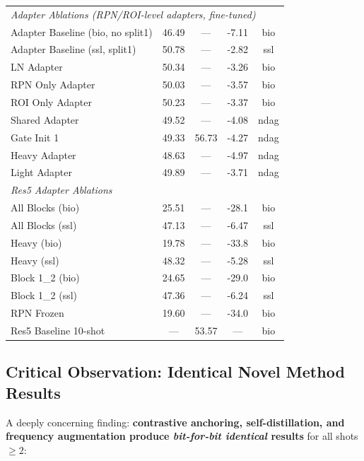 \documentclass[11pt,a4paper]{article}
\begin{document}
\begin{table}[h!]
\begin{tabular}{p{5.5cm}cccc}
\midrule
\multicolumn{5}{l}{\textit{Adapter Ablations (RPN/ROI-level adapters, fine-tuned)}} \\
Adapter Baseline (bio, no split1) & 46.49 & --- & \textcolor{worse}{-7.11} & bio \\
Adapter Baseline (ssl, split1) & 50.78 & --- & \textcolor{worse}{-2.82} & ssl \\
LN Adapter & 50.34 & --- & \textcolor{worse}{-3.26} & bio \\
RPN Only Adapter & 50.03 & --- & \textcolor{worse}{-3.57} & bio \\
ROI Only Adapter & 50.23 & --- & \textcolor{worse}{-3.37} & bio \\
Shared Adapter & 49.52 & --- & \textcolor{worse}{-4.08} & ndag \\
Gate Init 1 & 49.33 & 56.73 & \textcolor{worse}{-4.27} & ndag \\
Heavy Adapter & 48.63 & --- & \textcolor{worse}{-4.97} & ndag \\
Light Adapter & 49.89 & --- & \textcolor{worse}{-3.71} & ndag \\
\midrule
\multicolumn{5}{l}{\textit{Res5 Adapter Ablations}} \\
All Blocks (bio) & 25.51 & --- & \textcolor{worse}{-28.1} & bio \\
All Blocks (ssl) & 47.13 & --- & \textcolor{worse}{-6.47} & ssl \\
Heavy (bio) & 19.78 & --- & \textcolor{worse}{-33.8} & bio \\
Heavy (ssl) & 48.32 & --- & \textcolor{worse}{-5.28} & ssl \\
Block 1\_2 (bio) & 24.65 & --- & \textcolor{worse}{-29.0} & bio \\
Block 1\_2 (ssl) & 47.36 & --- & \textcolor{worse}{-6.24} & ssl \\
RPN Frozen & 19.60 & --- & \textcolor{worse}{-34.0} & bio \\
Res5 Baseline 10-shot & --- & 53.57 & --- & bio \\
\bottomrule
\end{tabular}
\end{table}

\subsection{Critical Observation: Identical Novel Method Results}

A deeply concerning finding: \textbf{contrastive anchoring, self-distillation, and frequency augmentation produce \textit{bit-for-bit identical} results} for all shots $\geq 2$:
\end{document}
